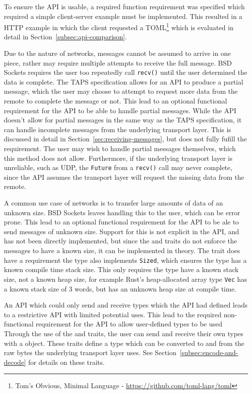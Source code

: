 To ensure the API is usable, a required function requirement was specified which required a simple client-server example
must be implemented.
This resulted in a HTTP example in which the client requested a TOML\footnote{Tom's Obvious, Minimal Language -
    \url{https://github.com/toml-lang/toml}} which is evaluated in detail in Section~\ref{subsec:api-comparison}.

Due to the nature of networks, messages cannot be assumed to arrive in one piece, rather may require multiple attempts
to receive the full message.
BSD Sockets requires the user too repeatedly call \texttt{recv()} until the user determined the data is complete.
The TAPS specification allows for an API to produce a partial message, which the user may choose to attempt to request
more data from the remote to complete the message or not.
This lead to an optional functional requirement for the API to be able to handle partial messages.
While the API doesn't allow for partial messages in the same way as the TAPS specification, it can handle incomplete
messages from the underlying transport layer.
This is discussed in detail in Section~\ref{sec:receiving-messages}, but does not fully fufill the requirement.
The user may wish to handle partial messages themselves, which this method does not allow.
Furthermore, if the underlying transport layer is unreliable, such as UDP, the \texttt{Future} from a \texttt{recv()}
call may never complete, since the API assumes the transport layer will request the missing data from the remote.

A common use case of networks is to transfer large amounts of data of an unknown size.
BSD Sockets leaves handling this to the user, which can be error prone.
This lead to an optional functional requirement for the API to be ale to send messages of unknown size.
Support for this is not explicit in the API, and has not been directly implemented, but since the \encode{} and
\decode{} traits do not enforce the messages to have a known size, it can be implemented in theory.
The \decode{} trait does have a requirement the type also implements \texttt{Sized}, which ensures the type has a known
compile time stack size.
This only requires the type have a known stack size, not a known heap size, for example Rust's heap-allocated array
type \texttt{Vec} has a known stack size of 3 words, but has an unknown heap size at compile time.

An API which could only send and receive types which the API had defined leads to a restrictive API with limited
potential uses.
This lead to the required non-functional requirement for the API to allow user-defined types to be used
Through the use of the \encode{} and \decode{} traits, the user can send and receive their own types with a
\connection{} object.
These traits define a type which can be converted to and from the raw bytes the underlying transport layer uses.
See Section~\ref{subsec:encode-and-decode} for details on these traits.

